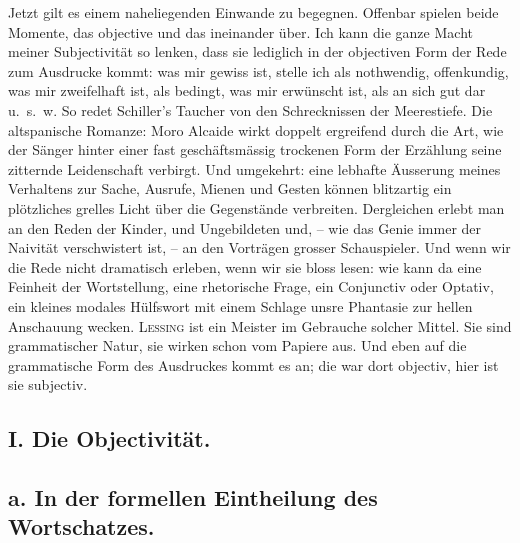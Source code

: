 Jetzt gilt es einem naheliegenden Einwande zu begegnen. Offenbar spielen beide Momente, das objective und das   ineinander über. Ich kann die ganze Macht meiner Subjectivität so lenken, dass sie lediglich in der objectiven Form der Rede zum Ausdrucke kommt: was mir gewiss ist, stelle ich als nothwendig, offenkundig, was mir zweifelhaft ist, als bedingt, was mir erwünscht ist, als an sich gut dar u.~s.~w. So redet Schiller’s Taucher von den Schrecknissen der Meerestiefe. Die altspanische Romanze: Moro Alcaide wirkt doppelt ergreifend durch die Art, wie der Sänger hinter einer fast geschäftsmässig trockenen Form der Erzählung seine zitternde Leidenschaft verbirgt. Und umgekehrt: eine lebhafte Äusserung meines Verhaltens zur Sache, Ausrufe, Mienen und Gesten können blitzartig ein plötzliches grelles Licht über die Gegenstände verbreiten. Dergleichen erlebt man an den Reden der Kinder, und Ungebildeten und, – wie das Genie immer der Naivität verschwistert ist, – an den Vorträgen grosser Schauspieler. Und wenn wir die Rede nicht dramatisch erleben, wenn wir sie bloss \label{fp.418} lesen: wie kann da eine Feinheit der Wortstellung, eine rhetorische Frage, ein Conjunctiv oder Optativ, ein kleines modales Hülfswort mit einem Schlage unsre Phantasie zur hellen Anschauung wecken. \textsc{Lessing} ist ein Meister im Gebrauche solcher Mittel. Sie sind grammatischer Natur, sie wirken schon vom Papiere aus. Und eben auf die grammatische Form des Ausdruckes kommt es an; die war dort objectiv, hier ist sie subjectiv.

\subsection*{I. Die Objectivität.}\label{IV.IV.Ia}
\subsection*{a. In der formellen Eintheilung des Wortschatzes.}

